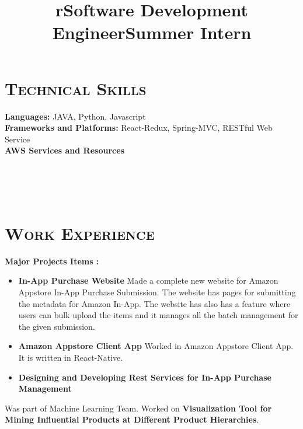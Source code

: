 \begin{resume}


\section{\textsc{Technical Skills}}
\textbf{Languages:}  JAVA, Python, Javascript \\
\textbf{Frameworks and Platforms:}  React-Redux, Spring-MVC, RESTful Web Service \\
\textbf{AWS Services and Resources}



\begin{formatb}
  \title{r}\\
  \\
  \body\\
\end{formatb}

\section{\textsc{Work Experience}}


\title{Software Development Engineer}
\begin{position}
\textbf{Major Projects Items :}
\begin{itemize}
\item \textbf{In-App Purchase Website} Made a complete new website for Amazon Appstore In-App Purchase Submission. The website has pages for submitting the metadata for Amazon In-App. The website has also has a feature where users can bulk upload the items and it manages all the batch management for the given submission.

\item \textbf{Amazon Appstore Client App} Worked in Amazon Appstore Client App. It is written in React-Native.

\item \textbf{Designing and Developing Rest Services for In-App Purchase Management}

\end{itemize}
\end{position}


\title{Summer Intern}
\begin{position}
Was part of Machine Learning Team. Worked on \textbf{Visualization Tool for Mining
Influential Products at Different Product Hierarchies}.
\end{position}


\end{resume}
